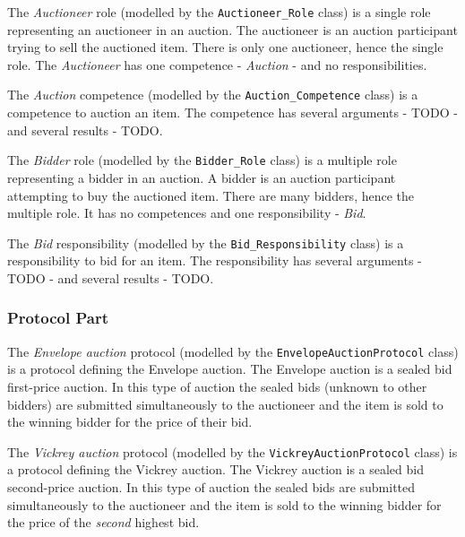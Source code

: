 The \textit{Auctioneer} role (modelled by the \texttt{Auctioneer\_Role} class) is a single role representing an auctioneer in an auction.
The auctioneer is an auction participant trying to sell the auctioned item.
There is only one auctioneer, hence the single role.
The \textit{Auctioneer} has one competence - \textit{Auction} - and no responsibilities.

The \textit{Auction} competence (modelled by the \texttt{Auction\_Competence} class) is a competence to auction an item.
The competence has several arguments - TODO - and several results - TODO.

The \textit{Bidder} role (modelled by the \texttt{Bidder\_Role} class) is a multiple role representing a bidder in an auction.
A bidder is an auction participant attempting to buy the auctioned item.
There are many bidders, hence the multiple role.
It has no competences and one responsibility - \textit{Bid}.

The \textit{Bid} responsibility (modelled by the \texttt{Bid\_Responsibility} class) is a responsibility to bid for an item.
The responsibility has several arguments - TODO - and several results - TODO.

\subsubsection*{Protocol Part}

The \textit{Envelope auction} protocol (modelled by the \texttt{EnvelopeAuctionProtocol} class) is a protocol defining the Envelope auction.
The Envelope auction is a sealed bid first-price auction.
In this type of auction the sealed bids (unknown to other bidders) are submitted simultaneously to the auctioneer and the item is sold to the winning bidder for the price of their bid.

The \textit{Vickrey auction} protocol (modelled by the \texttt{VickreyAuctionProtocol} class) is a protocol defining the Vickrey auction.
The Vickrey auction is a sealed bid second-price auction.
In this type of auction the sealed bids are submitted simultaneously to the auctioneer and the item is sold to the winning bidder for the price of the \textit{second} highest bid.

